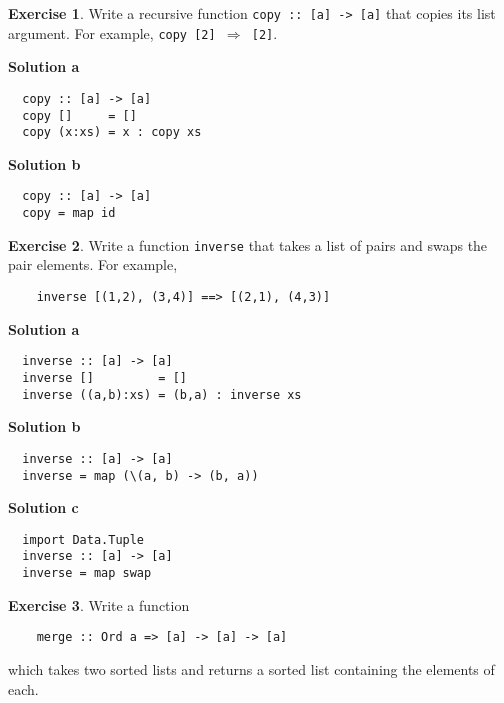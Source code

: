 \documentclass[11pt,a4paper]{article}
\theoremstyle{definition}
\newtheorem{exr}{Exercise}
\begin{document}
\begin{exr}
  Write a recursive function \texttt{copy :: [a] -> [a]} that copies its list 
  argument. For example, \texttt{copy [2] $\Rightarrow$ [2]}.
\end{exr}

\textbf{Solution a}
\begin{lstlisting}
  copy :: [a] -> [a]
  copy []     = []
  copy (x:xs) = x : copy xs
\end{lstlisting}

\textbf{Solution b}
\begin{lstlisting}
  copy :: [a] -> [a]
  copy = map id
\end{lstlisting}

\vspace{5mm}

\begin{exr}
  Write a function \texttt{inverse} that takes a list of pairs and swaps the 
  pair elements. For example,
  \begin{lstlisting}
    inverse [(1,2), (3,4)] ==> [(2,1), (4,3)]
  \end{lstlisting}
\end{exr}

\textbf{Solution a}
\begin{lstlisting}
  inverse :: [a] -> [a]
  inverse []         = []
  inverse ((a,b):xs) = (b,a) : inverse xs
\end{lstlisting}

\textbf{Solution b}
\begin{lstlisting}
  inverse :: [a] -> [a]
  inverse = map (\(a, b) -> (b, a))
\end{lstlisting}

\newpage
\textbf{Solution c}
\begin{lstlisting}
  import Data.Tuple
  inverse :: [a] -> [a]
  inverse = map swap
\end{lstlisting}


\vspace{5mm}

\begin{exr}
  Write a function

  \begin{lstlisting}
    merge :: Ord a => [a] -> [a] -> [a]
  \end{lstlisting}

  which takes two sorted lists and returns a sorted list containing the 
  elements of each.
\end{exr}
\end{document}
